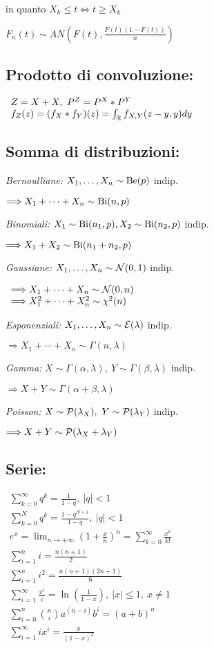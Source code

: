 in quanto $X_k \leq t\Leftrightarrow t\geq X_k$

$F_n (t)\sim AN\left( F(t),\frac{F(t)(1-F(t))}{n}\right)$
\subsection{Prodotto di convoluzione:}

$ \begin{array}{l}
Z=X+X,\ P^Z =P^X *P^Y\\
f_Z (z)=( f_X *f_Y) (z)=\int_{\mathbb R} f_{X,Y} (z-y,y)dy
\end{array}$
\subsection{Somma di distribuzioni:}

\textit{Bernoulliane:} $X_1 ,\dotsc ,X_n \sim \operatorname{Be} (p)$ indip.

$\Longrightarrow X_1 +\cdots +X_n \sim \operatorname{Bi} (n,p)$

\textit{Binomiali:} $X_1 \sim \operatorname{Bi} (n_1 ,p),X_2 \sim \operatorname{Bi} (n_2 ,p)$ indip.

$\Longrightarrow X_1 +X_2 \sim \operatorname{Bi} (n_1 +n_2 ,p)$

\textit{Gaussiane:} $X_1 ,\dotsc ,X_n \sim \mathcal N (0,1)$ indip.

$ \begin{array}{l}
\Longrightarrow X_1 +\cdots +X_n \sim \mathcal N (0,n)\\
\Longrightarrow X^2_1 +\cdots +X^2_n \sim \chi^2 (n)
\end{array}$

\textit{Esponenziali:} $X_1 ,\dotsc ,X_n \sim \mathcal E (\lambda )$ indip.

$\Longrightarrow X_1 +\cdots +X_n \sim \Gamma (n,\lambda )$

\textit{Gamma:} $X\sim \Gamma (\alpha ,\lambda ),\ Y\sim \Gamma (\beta ,\lambda )$ indip.

$\Longrightarrow X+Y\sim \Gamma (\alpha +\beta ,\lambda )$

\textit{Poisson:} $X\sim \Pc( \lambda_X) ,\ Y\sim \Pc( \lambda_Y)$ indip.

$\Longrightarrow X+Y\sim \mathcal P( \lambda_X +\lambda_Y)$
\subsection{Serie:}

$ \begin{array}{l}
\sum^{\infty}_{k=0} q^k =\frac{1}{1-q} ,\ |q|< 1\\
\sum^N_{k=0} q^k =\frac{1-q^{N+1}}{1-q} ,\ |q|< 1\\
e^x =\lim_{n\rightarrow +\infty}\left( 1+\frac{x}{n}\right)^n =\sum^{\infty}_{k=0}\frac{x^k}{k!}\\
\sum^n_{i=1} i=\frac{n(n+1)}{2}\\
\sum^n_{i=1} i^2 =\frac{n(n+1)(2n+1)}{6}\\
\sum^{\infty}_{i=1}\frac{x^i}{i} =\ln\left(\frac{1}{1-x}\right) ,\ |x|\leq 1,\ x\neq 1\\
\sum^n_{i=0}\binom{n}{i} a^{(n-i)} b^i =(a+b)^n\\
\sum^{\infty}_{i=1} ix^i =\frac{x}{(1-x)^2}
\end{array}$
